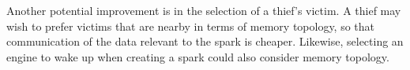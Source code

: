 Another potential improvement is in the selection of a thief's victim.
A thief may wish to prefer victims that are nearby in terms of memory
topology, so that communication of the data relevant to the spark is
cheaper.
Likewise, selecting an engine to wake up when creating a spark could also
consider memory topology.

